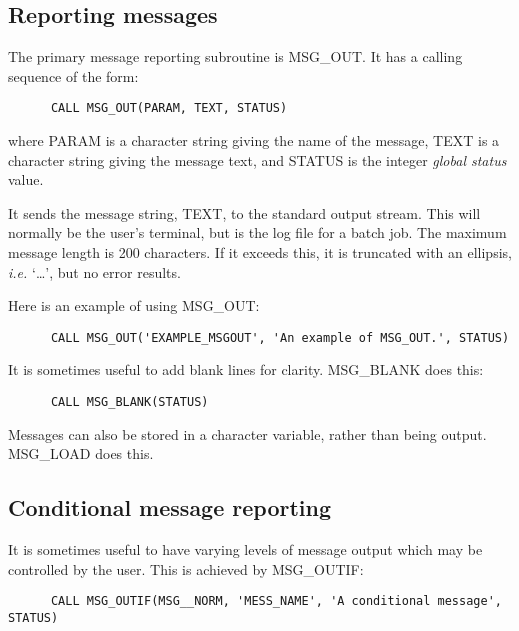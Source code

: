 \subsection {Reporting messages}

The primary message reporting subroutine is MSG\_OUT.
It has a calling sequence of the form:

\begin{small}
\begin{verbatim}
      CALL MSG_OUT(PARAM, TEXT, STATUS)
\end{verbatim}
\end{small}

where PARAM is a character string giving the name of the message, TEXT is a
character string giving the message text, and STATUS is the integer
{\em global status} value.

It sends the message string, TEXT, to the standard output stream.
This will normally be the user's terminal, but is the log file for a batch job.
The maximum message length is 200 characters.
If it exceeds this, it is truncated with an ellipsis, {\em i.e.} `\ldots', but
no error results.

Here is an example of using MSG\_OUT:

\begin{small}
\begin{verbatim}
      CALL MSG_OUT('EXAMPLE_MSGOUT', 'An example of MSG_OUT.', STATUS)
\end{verbatim}
\end{small}

It is sometimes useful to add blank lines for clarity.
MSG\_BLANK does this:

\begin{small}
\begin{verbatim}
      CALL MSG_BLANK(STATUS)
\end{verbatim}
\end{small}

Messages can also be stored in a character variable, rather than being output.
MSG\_LOAD does this.

\subsection {Conditional message reporting}

It is sometimes useful to have varying levels of message output which may be
controlled by the user.
This is achieved by MSG\_OUTIF:

\begin{small}
\begin{verbatim}
      CALL MSG_OUTIF(MSG__NORM, 'MESS_NAME', 'A conditional message', STATUS)
\end{verbatim}
\end{small}

